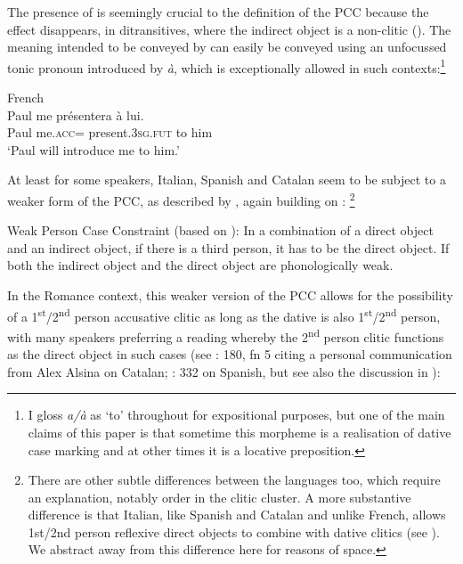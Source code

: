 \documentclass[output=paper,colorlinks,citecolor=brown,nonflat]{./langscibook}
\begin{document}
The presence of  is seemingly crucial to the definition of the PCC because the effect disappears, in ditransitives, where the indirect object is a non-clitic (\citealt{Kayne1975, Rezac2008}). The meaning intended to be conveyed by  can easily be conveyed using an unfocussed tonic pronoun introduced by \textit{à}, which is exceptionally allowed in such contexts:\footnote{I gloss \textit{a/à} as ‘to’ throughout for expositional purposes, but one of the main claims of this paper is that sometime this morpheme is a realisation of dative case marking and at other times it is a locative preposition.} 

\ea%
    \label{ex:sheehan:3}
    French \citep[174]{Kayne1975}\\
    \gll    Paul   me     présentera     à   lui.\\
            Paul  me.\textsc{acc}=  present.\textsc{3sg.fut}   to   him\\
    \glt    ‘Paul will introduce me to him.’
\z

At least for some speakers, Italian, Spanish and Catalan seem to be subject to a weaker form of the PCC, as described by \citet{Bonet1991}, again building on \citet{Perlmutter1971}:\textstyleFootnoteSymbol{} \footnote{There are other subtle differences between the languages too, which require an explanation, notably order in the clitic cluster. A more substantive difference is that Italian, like Spanish and Catalan and unlike French, allows 1st/2nd person reflexive direct objects to combine with dative clitics (see \citealt{Kayne1975, Bianchi2006}). We abstract away from this difference here for reasons of space.}

\ea%
    \label{ex:sheehan:4}
    Weak Person Case Constraint (based on \citealt[181-182]{Bonet1991}):
    \ea\label{ex:sheehan:4a}
    In a combination of a direct object and an indirect object, if there is a third person, it has to be the direct object.
    \ex\label{ex:sheehan:4b}
    If both the indirect object and the direct object are phonologically weak.
    \z
\z

In the Romance context, this weaker version of the PCC allows for the possibility of a 1\textsuperscript{st}/2\textsuperscript{nd} person accusative clitic as long as the dative is also 1\textsuperscript{st}/2\textsuperscript{nd} person, with many speakers preferring a reading whereby the 2\textsuperscript{nd} person clitic functions as the direct object in such cases (see \citealt{Bonet1991}: 180, fn 5 citing a personal communication from Alex Alsina on Catalan; \citealt{OrmazabalRomero2010}: 332 on Spanish, but see also the discussion in \citealt{Bonet2007}):
\end{document}
